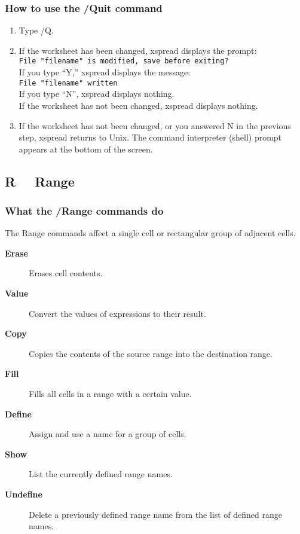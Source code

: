 \subsubsection*{How to use the /Quit command}
\begin{enumerate}
\item{Type /Q.}
\item{If the worksheet has been changed, xspread displays the prompt:\\
        {\tt File "filename" is modified, save before exiting?}\\
        If you type ``Y,'' xspread displays the message:\\
        {\tt  File "filename" written}\\
            If you type ``N'', xspread displays nothing.\\
            If the worksheet has not been changed, xspread displays nothing.}
\item{If the worksheet has not been changed, or you answered N in the previous
        step, xspread returns to Unix.  The command interpreter (shell) prompt
        appears at the bottom of the screen.}
\end{enumerate}

\subsection*{R \ \      Range}
        
\subsubsection*{What the /Range commands do}
The Range commands affect a single cell or rectangular group of 
adjacent cells.
\begin{description}
\item[{\bf Erase   }]{Erases cell contents.}
\item[{\bf Value   }]{Convert the values of expressions to their result.}
\item[{\bf Copy    }]{Copies the contents of the source range into the
        destination range.}
\item[{\bf Fill    }]{Fills all cells in a range with a certain value.}
\item[{\bf Define  }]{Assign and use a name for a group of cells.}
\item[{\bf Show    }]{List the currently defined range names.}
\item[{\bf Undefine }]{Delete a previously defined range name from the list of
        defined range names.}
\end{description}

